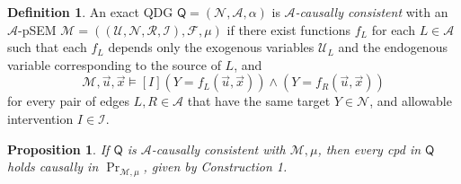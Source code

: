 \documentclass{article}
\newcommand{\bp}[1][L]{\mathbf{p}_{\!_#1\!}}
\newcommand{\N}{\mathcal N}
\newcommand{\Ed}{\mathcal A}
\newcommand{\dg}[1]{\mathsf #1}
\newcommand\mat[1]{\mathbf #1}
\theoremstyle{plain}
\newtheorem{prop}[theorem]{Proposition}
\theoremstyle{definition}
\newtheorem{defn}{Definition}
\theoremstyle{remark}
\begin{document}
\begin{defn}
	An exact QDG $\dg Q = (\N, \Ed, \alpha)$ is \emph{$\Ed$-causally consistent} with an $\Ed$-pSEM $\mathcal M = ((\mathcal U, \N, \mathcal R, \mathcal I), \mathcal F,\mu)$
	if there exist functions $f_L$ for each $L \in \Ed$ such that
	each $f_L$ depends only the exogenous variables $\mathcal U_L$ and the endogenous variable corresponding to the source of $L$, and 
	\[\mathcal M, \vec u, \vec x \models [I](Y \!= f_L(\vec u, \vec x)) \land (Y \!= f_R(\vec u, \vec x)) \]
	 for every pair of edges $L, R \in \Ed$ that have the same target $Y \in \N$, and allowable intervention $I \in \mathcal I$.
%	
\end{defn}

\begin{prop}
	If $\dg Q$ is $\Ed$-causally consistent with $\mathcal M,\mu$, then every cpd in $\dg Q$ holds causally in $\Pr_{\mathcal M, \mu}$, given by Construction 1.
\end{prop}
\end{document}
